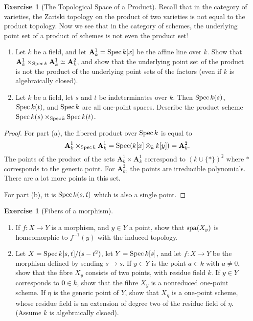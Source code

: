 \documentclass[]{pcmi}
\theoremstyle{plain}
\theoremstyle{definition}
\newtheorem{Exercise}[subsubsection]{Exercise}
\theoremstyle{remark}
\begin{document}
\begin{Exercise}[The Topological Space of a Product]
    Recall that in the category of varieties, the Zariski topology on the product of two varieties is not equal to the product topology. Now we see that in the category of schemes, the underlying point set of a product of schemes is not even the product set!
    \begin{enumerate}[label = (\alph*)]
        \item Let $k$ be a field, and let $\mathbf{A}_k^1 = \operatorname{Spec} k[x]$ be the affine line over $k$. Show that $\mathbf{A}_k^1 \times_{\operatorname{Spec} k} \mathbf{A}_k^1 \simeq \mathbf{A}_k^2$, and show that the underlying point set of the product is not the product of the underlying point sets of the factors (even if $k$ is algebraically closed). 
        \item Let $k$ be a field, let $s$ and $t$ be indeterminates over $k$. Then $\operatorname{Spec} k(s)$, $\operatorname{Spec} k(t)$, and $\operatorname{Spec} k$ are all one-point spaces. Describe the product scheme $\operatorname{Spec} k(s) \times_{\operatorname{Spec} k} \operatorname{Spec} k(t)$.
    \end{enumerate}
\end{Exercise}

\begin{proof}
    For part (a), the fibered product over $\operatorname{Spec} k$ is equal to 
    \[
        \mathbf{A}_k^1 \times_{\operatorname{Spec} k} \mathbf{A}_k^1 = \operatorname{Spec} (k[x] \otimes_k k[y] ) = \mathbf{A}_k^2. 
    \]
    The points of the product of the sets $\mathbf{A}_k^1 \times \mathbf{A}_k^1$ correspond to $(k \cup \{*\})^2$ where $*$ corresponds to the generic point. For $\mathbf{A}_k^2$, the points are irreducible polynomials. There are a lot more points in this set. 

    For part (b), it is $\operatorname{Spec} k(s, t)$ which is also a single point. 
\end{proof}

\begin{Exercise}[Fibers of a morphism]
    \phantom{h}
    \begin{enumerate}[label = (\alph*)]
        \item If $f : X \to Y$ is a morphism, and $y \in Y$ a point, show that $\operatorname{spa}(X_y)$ is homeomorphic to $f^{-1}(y)$ with the induced topology. 
        \item Let $X = \operatorname{Spec} k[s,t] / (s - t^2)$, let $Y = \operatorname{Spec} k[s]$, and let $f : X \to Y$ be the morphism defined by sending $s \to s$. If $y \in Y$ is the point $a \in k$ with $a \neq 0$, show that the fibre $X_y$ consists of two points, with residue field $k$. If $y \in Y$ corresponds to $0 \in k$, show that the fibre $X_y$ is a nonreduced one-point scheme. If $\eta$ is the generic point of $Y$, show that $X_\eta$ is a one-point scheme, whose residue field is an extension of degree two of the residue field of $\eta$. (Assume $k$ is algebraically clsoed). 
    \end{enumerate}
\end{Exercise}
\end{document}
